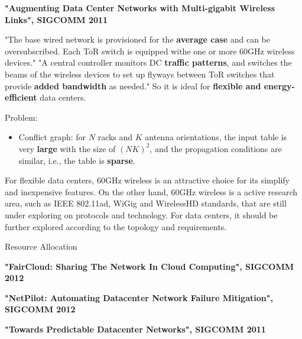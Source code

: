\documentclass[journal,onecolumn,11pt]{IEEEtran}
\begin{document}
\textbf{"Augmenting Data Center Networks with Multi-gigabit Wireless Links", SIGCOMM 2011}

"The base wired network is provisioned for the \textbf{average case} and can be oversubscribed. Each ToR switch is equipped withe one or more 60GHz wireless devices." "A central controller monitors DC \textbf{traffic patterns}, and switches the beams of the wireless devices to set up flyways between ToR switches that provide \textbf{added bandwidth} as needed." So it is ideal for \textbf{flexible and energy-efficient} data centers.

Problem:
\begin{itemize}
  \item Conflict graph: for $N$ racks and $K$ antenna orientations, the input table is very \textbf{large} with the size of $(NK)^2$, and the propagation conditions are similar, i.e., the table is \textbf{sparse}.
\end{itemize}

For flexible data centers, 60GHz wireless is an attractive choice for its simplify and inexpensive features. On the other hand, 60GHz wireless is a active research area, such as IEEE 802.11ad, WiGig and WirelessHD standards, that are still under exploring on protocols and technology. For data centers, it should be further explored according to the topology and requirements.

Resource Allocation

\textbf{"FairCloud: Sharing The Network In Cloud Computing", SIGCOMM 2012}

\textbf{"NetPilot: Automating Datacenter Network Failure Mitigation", SIGCOMM 2012}

\textbf{"Towards Predictable Datacenter Networks", SIGCOMM 2011}

\renewcommand\refname{References}
%


\end{document}
